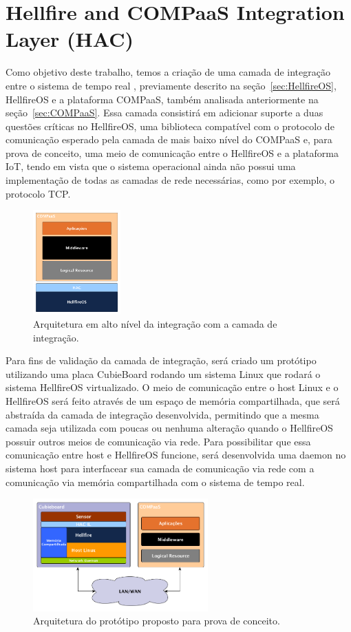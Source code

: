 \section{Hellfire and COMPaaS Integration Layer (HAC)}
\label{sec:HAC}
Como objetivo deste trabalho, temos a criação de uma camada de integração entre o sistema de tempo real
, previamente descrito na seção~\ref{sec:HellfireOS}, HellfireOS e a plataforma COMPaaS, também analisada
anteriormente na seção~\ref{sec:COMPaaS}. Essa camada consistirá em adicionar suporte a duas questões
críticas no HellfireOS, uma biblioteca compatível com o protocolo de comunicação esperado pela camada de
mais baixo nível do COMPaaS e, para prova de conceito, uma meio de comunicação entre o HellfireOS e a
plataforma IoT, tendo em vista que o sistema operacional ainda não possui uma implementação de todas as
camadas de rede necessárias, como por exemplo, o protocolo TCP.

\begin{figure}[H]
	\centering
		\includegraphics[width=0.3\textwidth]{fig/COMPaaS_HF.png}
	\caption{Arquitetura em alto nível da integração com a camada de integração.}
\end{figure}

Para fins de validação da camada de integração, será criado um protótipo utilizando uma placa
CubieBoard rodando um sistema Linux que rodará o sistema HellfireOS virtualizado. O meio de comunicação
entre o host Linux e o HellfireOS será feito através de um espaço de memória compartilhada, que será
abstraída da camada de integração desenvolvida, permitindo que a mesma camada seja utilizada com
poucas ou nenhuma alteração quando o HellfireOS possuir outros meios de comunicação via rede.
Para possibilitar que essa comunicação entre host e HellfireOS funcione, será desenvolvida uma
daemon no sistema host para interfacear sua camada de comunicação via rede com a comunicação
via memória compartilhada com o sistema de tempo real.

\begin{figure}[H]
	\centering
		\includegraphics[width=0.6\textwidth]{fig/HAC_IL.png}
	\caption{Arquitetura do protótipo proposto para prova de conceito.}
	\label{fig:HAC_IL}
\end{figure}


